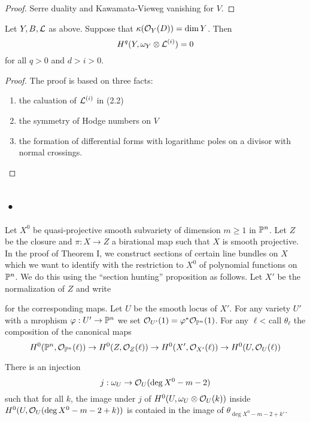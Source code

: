 \documentclass[12pt]{article}
\begin{document}
\begin{proof}
Serre duality and Kawamata-Vieweg vanishing for $V$.
\end{proof}

\begin{theorem}
Let $Y,B,\L$ as above. Suppose that $\kappa(\struct{Y}(D)) = \dim{Y}$. Then
\[ H^q(Y, \omega_Y \ot \L^{(i)}) = 0\]
for all $q > 0$ and $d > i > 0$.
\end{theorem}

\begin{proof}
The proof is based on three facts:
\begin{enumerate}
\item the caluation of $\L^{(i)}$ in (2.2)
\item the symmetry of Hodge numbers on $V$
\item the formation of differential forms with logarithmc poles on a divisor with normal crossings.
\end{enumerate}
\end{proof}

\subsection{•}

Let $X^0$ be quasi-projective smooth subvariety of dimension $m \ge 1$ in $\P^n$. Let $Z$ be the closure and $\pi : X \to Z$ a birational map such that $X$ is smooth projective. In the proof of Theorem I, we construct sections of certain line bundles on $X$ which we want to identify with the restriction to $X^0$ of polynomial functions on $\P^n$. We do this using the ``section hunting'' proposition as follows. Let $X'$ be the normalization of $Z$ and write
\begin{center}
\end{center}
for the corresponding maps. Let $U$ be the smooth locus of $X'$. For any variety $U'$ with a mrophism $\varphi : U' \to \P^n$ we set $\struct{U'}(1) = \varphi^* \struct{\P^n}(1)$. For any $\ell$< call $\theta_\ell$ the composition of the canonical maps
\[ H^0(\P^n, \struct{\P^n}(\ell)) \to H^0(Z, \struct{Z}(\ell)) \to H^0(X', \struct{X'}(\ell)) \to H^0(U, \struct{U}(\ell)) \]

\begin{prop}
There is an injection
\[ j : \omega_U \to \struct{U}(\deg{X^0} - m - 2) \]
such that for all $k$, the image under $j$ of $H^0(U, \omega_U \ot \struct{U}(k))$ inside $H^0(U, \struct{U}(\deg{X^0} - m - 2 +k ))$ is contaied in the image of $\theta_{\deg{X^0} - m - 2 + k'}$. 
\end{prop}
\end{document}
